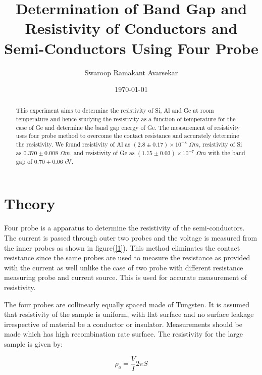 \documentclass[a4paper, amsfonts, amssymb, amsmath, reprint, showkeys, nofootinbib, twoside]{revtex4-1}
\begin{document}
\title{Determination of Band Gap and Resistivity of Conductors and Semi-Conductors Using Four Probe}
\author{Swaroop Ramakant Avarsekar}
\date{\today}

	
\begin{abstract}
This experiment aims to determine the resistivity of Si, Al and Ge at room temperature and hence studying the resistivity as a function of temperature for the case of Ge and determine the band gap energy of Ge. The measurement of resistivity uses four probe method to overcome the contact resistance and accurately determine the resistivity. We found resistivity of Al as $(2.8\pm0.17)\times10^{-8}$ $\Omega m$, resistivity of Si as $0.370\pm0.008$ $\Omega m$, and resistivity of Ge as $(1.75\pm0.03)\times10^{-7}$ $\Omega m$ with the band gap of $0.70\pm0.06$ eV.
\end{abstract}
	
	
\maketitle

\section{Theory}
Four probe is a apparatus to determine the resistivity of the semi-conductors. The current is passed through outer two probes and the voltage is measured from the inner probes as shown in figure(\ref{1}). This method eliminates the contact resistance since the same probes are used to measure the resistance as provided with the current as well unlike the case of two probe with different resistance measuring probe and current source. This is used for accurate measurement of resistivity. 

The four probes are collinearly equally spaced made of Tungsten. It is assumed that resistivity of the sample is uniform, with flat surface and no surface leakage irrespective of material be a conductor or insulator. Measurements should be made which has high recombination rate surface. The resistivity for the large sample is given by:

\begin{equation}
	\rho_o=\frac{V}{I}2\pi S
\end{equation}  
\end{document}
